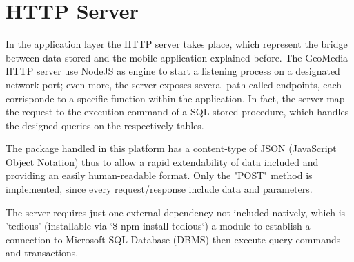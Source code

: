 \documentclass[conference]{IEEEtran}
\begin{document}
\section{HTTP Server}

In the application layer the HTTP server takes place, which represent the bridge between data stored and the mobile application explained before.
The GeoMedia HTTP server use NodeJS\cite{b4} as engine to start a listening process on a designated network port; even more, the server exposes several path called endpoints, each corrisponde to a specific function within the application. In fact, the server map the request to the execution command of a SQL stored procedure, which handles the designed queries on the respectively tables.

The package handled in this platform has a content-type of JSON (JavaScript Object Notation) thus to allow a rapid extendability of data included and providing an easily human-readable format.
Only the "POST" method is implemented, since every request/response include data and parameters.

The server requires just one external dependency not included natively, which is 'tedious'\cite{b5} (installable via `\$ npm install tedious`) a module to establish a connection to Microsoft SQL Database (DBMS) then execute query commands and transactions.
\end{document}
